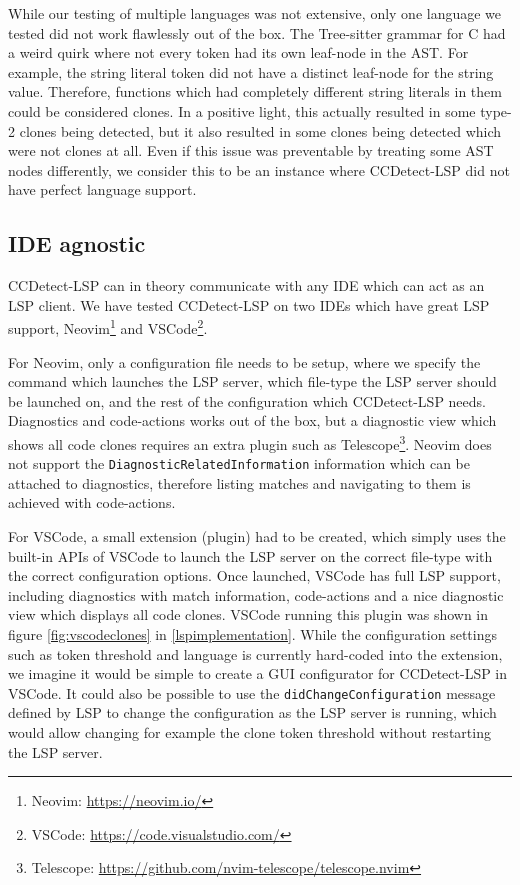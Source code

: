 While our testing of multiple languages was not extensive, only one language we tested did
not work flawlessly out of the box. The Tree-sitter grammar for C had a weird quirk where
not every token had its own leaf-node in the AST. For example, the string literal token
did not have a distinct leaf-node for the string value. Therefore, functions which had
completely different string literals in them could be considered clones. In a positive
light, this actually resulted in some type-2 clones being detected, but it also resulted
in some clones being detected which were not clones at all. Even if this issue was
preventable by treating some AST nodes differently, we consider this to be an instance
where CCDetect-LSP did not have perfect language support.

\subsection*{IDE agnostic}

CCDetect-LSP can in theory communicate with any IDE which can act as an LSP client. We
have tested CCDetect-LSP on two IDEs which have great LSP support, Neovim\footnote{Neovim:
\url{https://neovim.io/}} and VSCode\footnote{VSCode:
\url{https://code.visualstudio.com/}}. 

For Neovim, only a configuration file needs to be setup, where we specify the command
which launches the LSP server, which file-type the LSP server should be launched on, and
the rest of the configuration which CCDetect-LSP needs. Diagnostics and code-actions works
out of the box, but a diagnostic view which shows all code clones requires an extra plugin
such as Telescope\footnote{Telescope:
\url{https://github.com/nvim-telescope/telescope.nvim}}. Neovim does not support the
\verb|DiagnosticRelatedInformation| information which can be attached to diagnostics,
therefore listing matches and navigating to them is achieved with code-actions.

For VSCode, a small extension (plugin) had to be created, which simply uses the built-in
APIs of VSCode to launch the LSP server on the correct file-type with the correct
configuration options. Once launched, VSCode has full LSP support, including diagnostics
with match information, code-actions and a nice diagnostic view which displays all code
clones. VSCode running this plugin was shown in figure \ref{fig:vscodeclones} in
\cref{lspimplementation}. While the configuration settings such as token threshold and
language is currently hard-coded into the extension, we imagine it would be simple to
create a GUI configurator for CCDetect-LSP in VSCode. It could also be possible to use the
\verb|didChangeConfiguration| message defined by LSP to change the configuration as the
LSP server is running, which would allow changing for example the clone token threshold
without restarting the LSP server. 
